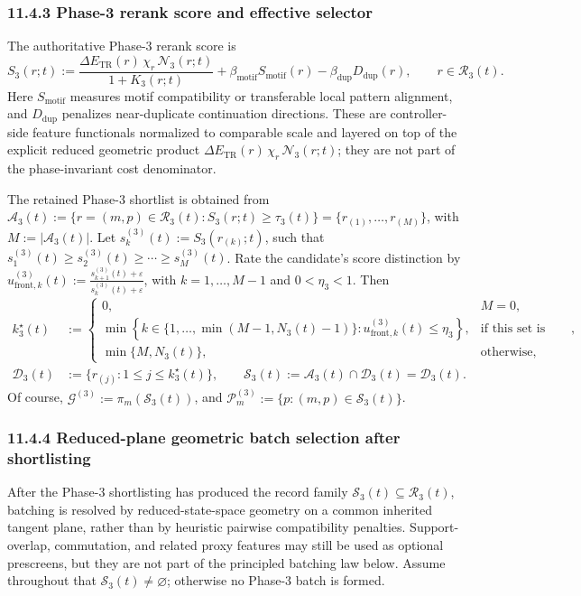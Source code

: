 \documentclass[11pt]{article}
\begin{document}
\subsubsection*{11.4.3 Phase-3 rerank score and effective selector}
The authoritative Phase-3 rerank score is
\[
S_3(r;t)
:=
\frac{\Delta E_{\mathrm{TR}}(r)\,\chi_r\,\mathcal N_3(r;t)}{1+K_3(r;t)}
+\beta_{\mathrm{motif}}S_{\mathrm{motif}}(r)-\beta_{\mathrm{dup}}D_{\mathrm{dup}}(r),
\qquad r\in\mathcal R_3(t).
\]
Here \(S_{\mathrm{motif}}\) measures motif compatibility or transferable local pattern alignment, and \(D_{\mathrm{dup}}\) penalizes near-duplicate continuation directions. These are controller-side feature functionals normalized to comparable scale and layered on top of the explicit reduced geometric product \(\Delta E_{\mathrm{TR}}(r)\,\chi_r\,\mathcal N_3(r;t)\); they are not part of the phase-invariant cost denominator.

The retained Phase-3 shortlist is obtained from \(\mathcal A_3(t):=\{r=(m,p)\in\mathcal R_3(t):S_3(r;t)\ge \tau_3(t)\}=\{r_{(1)},\dots,r_{(M)}\}\), with \(M:=|\mathcal A_3(t)|\). Let \(s_k^{(3)}(t):=S_3(r_{(k)};t)\), such that \(s^{(3)}_1(t)\ge s^{(3)}_2(t)\ge\cdots\ge s^{(3)}_M(t)\). Rate the candidate's score distinction by \(u_{\mathrm{front},k}^{(3)}(t):=\frac{s^{(3)}_{k+1}(t)+\varepsilon}{s^{(3)}_{k}(t)+\varepsilon}\), with \(k=1,\dots,M-1\) and \(0<\eta_3<1\). Then
\[
\begin{aligned}
k_3^\star(t)&:=
\begin{cases}
0, & M=0,\\[4pt]
\min\!\left\{k\in\{1,\dots,\min(M-1,N_3(t)-1)\}:u_{\mathrm{front},k}^{(3)}(t)\le \eta_3\right\},
& \text{if this set is nonempty},\\[6pt]
\min\{M,N_3(t)\}, & \text{otherwise},
\end{cases}\\
\mathcal D_3(t)&:=\{r_{(j)}:1\le j\le k_3^\star(t)\},
\qquad
\mathcal S_3(t):=\mathcal A_3(t)\cap \mathcal D_3(t)=\mathcal D_3(t).
\end{aligned}
\]
Of course, \(\mathcal G^{(3)}:=\pi_m(\mathcal S_3(t))\), and \(\mathcal P_m^{(3)}:=\{p:(m,p)\in\mathcal S_3(t)\}\).

\subsubsection*{11.4.4 Reduced-plane geometric batch selection after shortlisting}
After the Phase-3 shortlisting has produced the record family \(\mathcal S_3(t)\subseteq \mathcal R_3(t)\), batching is resolved by reduced-state-space geometry on a common inherited tangent plane, rather than by heuristic pairwise compatibility penalties. Support-overlap, commutation, and related proxy features may still be used as optional prescreens, but they are not part of the principled batching law below. Assume throughout that \(\mathcal S_3(t)\neq\varnothing\); otherwise no Phase-3 batch is formed.
\end{document}
